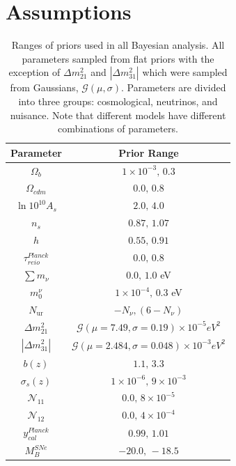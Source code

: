 \section{Assumptions}
\begin{table}
  \centering
  \caption{Ranges of priors used in all Bayesian analysis. All parameters sampled from flat priors with the exception of $\Delta m_{21}^2$ and $|\Delta m_{31}^2|$ which were sampled from Gaussians, $\mathcal{G}(\mu,\sigma)$. Parameters are divided into three groups: cosmological, neutrinos, and nuisance. Note that different models have different combinations of parameters.}
  \label{Tb:PriorsNeutrinos}
  \begin{tabular}{cc}
    \hline
    \hline
    Parameter & Prior Range \\
    \hline
    \hline
     $\Omega_b$ & $1 \times 10^{-3}, \, 0.3$    \\
     $\Omega_{cdm}$ & $0.0, \, 0.8$    \\[0.1cm]
     $\ln 10^{10} A_s$ & $2.0, \, 4.0$    \\
     $n_s$ & $0.87, \, 1.07$    \\
     $h$ & $0.55,\, 0.91$ \\
     $\tau^{Planck}_{reio}$  & $0.0,\, 0.8$ \\
     \hline
     $\sum m_{\nu}$ & $0.0,\, 1.0$ eV\\[0.1cm]
     $m^{\nu}_0$ & $1\times 10^{-4},\, 0.3$ eV \\
     $N_{\text{ur}}$ & $-N_{\nu},(6-N_{\nu})$ \\
     $\Delta m_{21}^2$ & $\mathcal{G}(\mu = 7.49, \sigma = 0.19)\times 10^{-5} eV^2$\\
     $|\Delta m_{31}^2|$ & $\mathcal{G}(\mu = 2.484, \sigma = 0.048)\times 10^{-3} eV^2$ \\
     \hline
     $b(z)$  & $1.1,\, 3.3$ \\
     $\sigma_s(z)$ & $1 \times 10^{-6},\, 9 \times 10^{-3}$ \\
     $\mathcal{N}_{11}$ & $0.0, \, 8\times 10^{-5}$ \\
     $\mathcal{N}_{12}$ & $0.0, \, 4\times 10^{-4}$ \\
     $y_{cal}^{Planck}$ & $0.99, \, 1.01$ \\
     $M_B^{SNe}$ & $-20.0,\, -18.5$\\
     \hline
     \hline
  \end{tabular}
\end{table}
